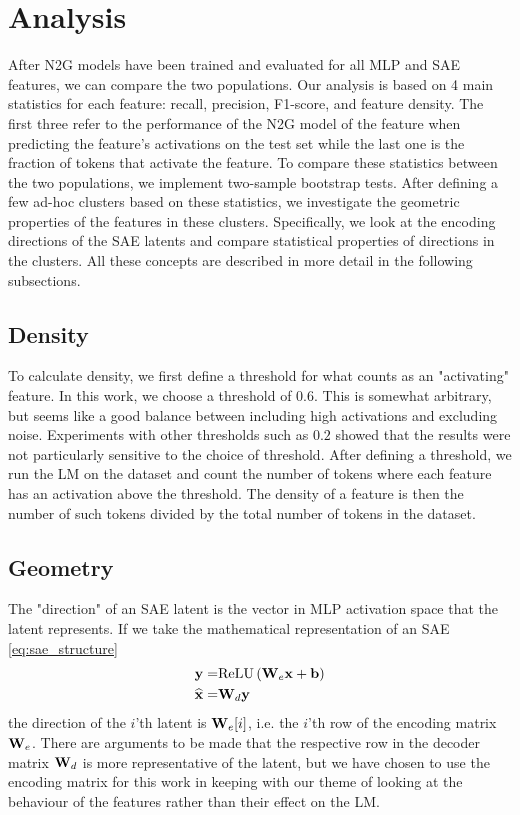 \section{Analysis}
After \ac{N2G} models have been trained and evaluated for all \ac{MLP} and \ac{SAE} features, we can compare the two populations.
Our analysis is based on 4 main statistics for each feature: recall, precision, F1-score, and feature density.
The first three refer to the performance of the \ac{N2G} model of the feature when predicting the feature's activations on the test set while the last one is the fraction of tokens that activate the feature.
To compare these statistics between the two populations, we implement two-sample bootstrap tests.
After defining a few ad-hoc clusters based on these statistics, we investigate the geometric properties of the features in these clusters.
Specifically, we look at the encoding directions of the \ac{SAE} latents and compare statistical properties of directions in the clusters.
All these concepts are described in more detail in the following subsections.

\subsection{Density}
\label{sec:density}
To calculate density, we first define a threshold for what counts as an "activating" feature.
In this work, we choose a threshold of $0.6$.
This is somewhat arbitrary, but seems like a good balance between including high activations and excluding noise.
Experiments with other thresholds such as $0.2$ showed that the results were not particularly sensitive to the choice of threshold.
After defining a threshold, we run the \ac{LM} on the dataset and count the number of tokens where each feature has an activation above the threshold.
The density of a feature is then the number of such tokens divided by the total number of tokens in the dataset.

\subsection{Geometry}
\label{sec:methods_geometry}
The "direction" of an \ac{SAE} latent is the vector in \ac{MLP} activation space that the latent represents.
If we take the mathematical representation of an \ac{SAE} \eqref{eq:sae_structure} 
\begin{align*}
    \mathbf{y}=&\mathrm{ReLU}\left(\mathbf{W}_e\mathbf{x}+\mathbf{b}\right)\\
    \widehat{\mathbf{x}}=&\mathbf{W}_d\mathbf{y}
\end{align*}
the direction of the $i$'th latent is $\mathbf{W}_e[i]$, i.e. the $i$'th row of the encoding matrix $\mathbf{W}_e$.
There are arguments to be made\parencite{nanda_open_2023} that the respective row in the decoder matrix $\mathbf{W}_d$ is more representative of the latent, but we have chosen to use the encoding matrix for this work in keeping with our theme of looking at the behaviour of the features rather than their effect on the \ac{LM}.

